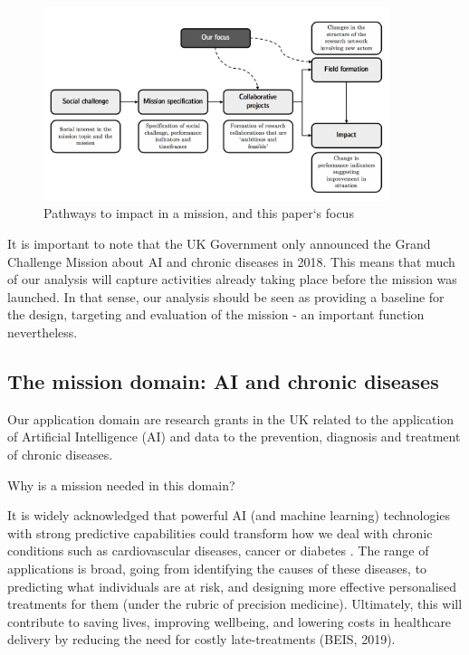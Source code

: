 \documentclass[11pt]{article}
\begin{document}
\begin{figure}[!ht]
    \centering
    \includegraphics[width=0.9\textwidth]{figures/fig_2_diagram.png}
    \caption{Pathways to impact in a mission, and this paper`s focus}
    \label{fig:diagram}
\end{figure}

It is important to note that the UK Government only announced the Grand Challenge Mission about AI and chronic diseases in 2018. This means that much of our analysis will capture activities already taking place before the mission was launched. In that sense, our analysis should be seen as providing a baseline for the design, targeting and evaluation of the mission - an important function nevertheless.

\subsection{The mission domain: AI and chronic diseases}
\label{subsec: domain}

Our application domain are research grants in the UK related to the application of Artificial Intelligence (AI) and data to the prevention, diagnosis and treatment of chronic diseases. 

Why is a mission needed in this domain? 

It is widely acknowledged that powerful AI (and machine learning) technologies with strong predictive capabilities could transform how we deal with chronic conditions such as cardiovascular diseases, cancer or diabetes \citep{cockburn_impact_2018, loder_confronting_2018, miotto2017deep, ravi2016deep}. The range of applications is broad, going from identifying the causes of these diseases, to predicting what individuals are at risk, and designing more effective personalised treatments for them (under the rubric of precision medicine). Ultimately, this will contribute to saving lives, improving wellbeing, and lowering costs in healthcare delivery by reducing the need for costly late-treatments (BEIS, 2019).
\end{document}
